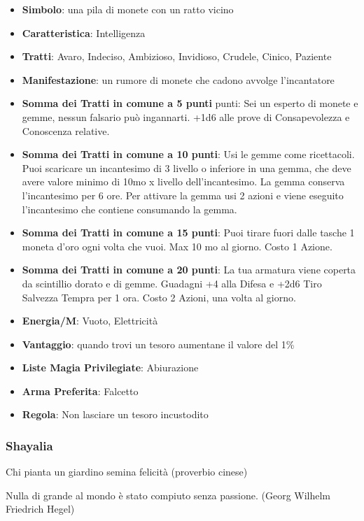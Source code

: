 \begin{multicols}{2}
\begin{itemize}[leftmargin=*] \setlength{\itemsep}{0pt}
\item \textbf{Simbolo}: una pila di monete con un ratto vicino
\item \textbf{Caratteristica}: Intelligenza
\item \textbf{Tratti}: Avaro, Indeciso, Ambizioso, Invidioso, Crudele, Cinico, Paziente
\item \textbf{Manifestazione}: un rumore di monete che cadono avvolge l'incantatore
\item \textbf{Somma dei Tratti in comune a 5 punti} punti: Sei un esperto di monete e gemme, nessun falsario può ingannarti. +1d6 alle prove di Consapevolezza e Conoscenza relative.
\item \textbf{Somma dei Tratti in comune a 10 punti}: Usi le gemme come ricettacoli. Puoi scaricare un incantesimo di 3 livello o inferiore in una gemma, che deve avere valore minimo di 10mo x livello dell'incantesimo. La gemma conserva l'incantesimo per 6 ore. Per attivare la gemma usi 2 azioni e viene eseguito l'incantesimo che contiene consumando la gemma.
\item \textbf{Somma dei Tratti in comune a 15 punti}: Puoi tirare fuori dalle tasche 1 moneta d'oro ogni volta che vuoi. Max 10 mo al giorno. Costo 1 Azione.
\item \textbf{Somma dei Tratti in comune a 20 punti}: La tua armatura viene coperta da scintillio dorato e di gemme. Guadagni +4 alla Difesa e +2d6 Tiro Salvezza Tempra per 1 ora. Costo 2 Azioni, una volta al giorno.
\item \textbf{Energia/M}: Vuoto, Elettricità
\item \textbf{Vantaggio}: quando trovi un tesoro aumentane il valore del 1\%
\item \textbf{Liste Magia Privilegiate}: Abiurazione
\item \textbf{Arma Preferita}: Falcetto
\item \textbf{Regola}: Non lasciare un tesoro incustodito
\end{itemize}

\subsubsection{Shayalia}\label{shayalia}\hypertarget{shayalia}{}

\begin{changemargin}{0.3cm}{0.3cm}\begin{enfasi}{
Chi pianta un giardino semina felicità (proverbio cinese)

\medskip

Nulla di grande al mondo è stato compiuto senza passione. (Georg Wilhelm Friedrich Hegel)

}\end{enfasi}\end{changemargin}\medskip


\end{multicols}
